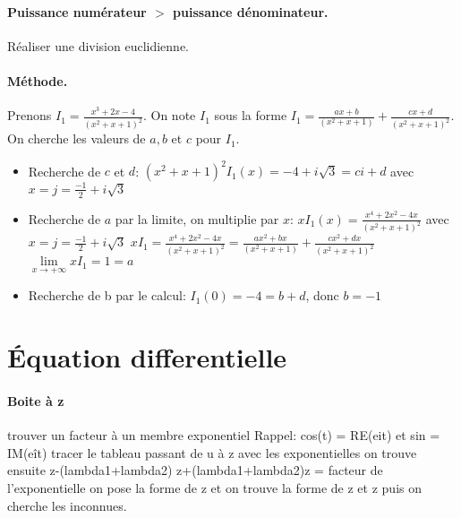 \documentclass{article}
\begin{document}
\paragraph{Puissance numérateur $>$ puissance dénominateur.}Réaliser une division euclidienne.
\paragraph{Méthode.} Prenons $I_{1} = \frac{x^3+2x-4}{(x^2+x+1)^2}$.
\newline On note $I_{1}$ sous la forme $I_{1} = \frac{ax+b}{(x^2+x+1)} + \frac{cx+d}{(x^2+x+1)^2}$.
On cherche les valeurs de $a, b$ et $c$ pour $I_{1}$.
\begin{itemize}
    \item Recherche de $c$ et $d$: $(x^2+x+1)^2I_{1}(x) = -4+i\sqrt{3} = ci+d $ 
        \newline avec $x = j = \frac{-1}{2}+i\sqrt{3}$
    
    \item Recherche de $a$ par la limite, on multiplie par $x$: $xI_{1}(x) = \frac{x^4+2x^2-4x}{(x^2+x+1)^2}$ 
        \newline avec $x = j = \frac{-1}{2}+i\sqrt{3}$
        \newline $xI_{1} = \frac{x^4+2x^2-4x}{(x^2+x+1)^2} = \frac{ax^2+bx}{(x^2+x+1)} + \frac{cx^2+dx}{(x^2+x+1)^2}$
        \newline $\lim\limits_{x \rightarrow +\infty} xI_{1} = 1 = a$
    
    \item Recherche de b par le calcul: $I_{1}(0) = -4 = b + d$, donc $b = -1$
\end{itemize}

\section*{Équation differentielle}


\paragraph[Boite à z]{\hypertarget{boiteaz}{Boite à z}}
trouver un facteur à un membre exponentiel
Rappel: cos(t) = RE(eit) et sin = IM(eît)
tracer le tableau passant de u à z avec
les exponentielles
on trouve ensuite z-(lambda1+lambda2)
z+(lambda1+lambda2)z = facteur de l'exponentielle
on pose la forme de z et on trouve la forme de z
 et z puis on cherche les inconnues. 
  
\end{document}
